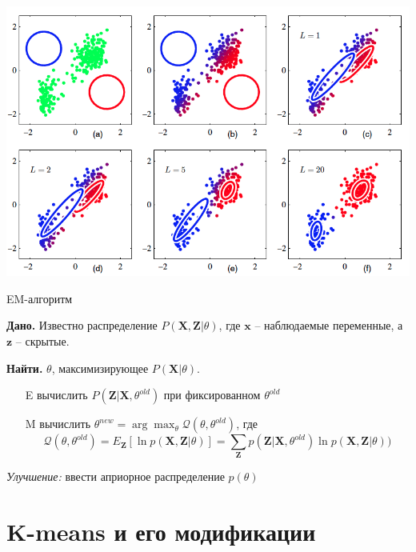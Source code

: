 \documentclass[10pt]{beamer}
\begin{document}
\begin{frame}{}

\begin{center}
\includegraphics[scale=0.35]{images/gauss.png}
\end{center}

\end{frame}

\begin{frame}{EM-алгоритм}

{\bf Дано.} Известно распределение $P(\mathbf{X}, \mathbf{Z} | \theta)$, где $\mathbf{x}$ -- наблюдаемые переменные, а $\mathbf{z}$ -- скрытые. 

{\bf Найти.} $\theta$,  максимизирующее $P(\mathbf{X} | \theta)$.

\vspace{1em}
\begin{itemize}
\item[E] вычислить $P(\mathbf{Z} | \mathbf{X}, \theta^{old})$ при фиксированном $\theta^{old}$
\item[M] вычислить $\theta^{new} = \arg \max_{\theta} \mathcal{Q} (\theta, \theta^{old})$, где
\[
\mathcal{Q} (\theta, \theta^{old}) = E_\mathbf{Z}[\ln p(\mathbf{X}, \mathbf{Z} | \theta)] = \sum_{\mathbf{Z}} p(\mathbf{Z} | \mathbf{X}, \theta^{old}) \ln p(\mathbf{X}, \mathbf{Z} | \theta))
\]
\end{itemize}
{\it Улучшение:} ввести априорное распределение $p(\theta)$

\end{frame}

\section{K-means и его модификации}
\end{document}
